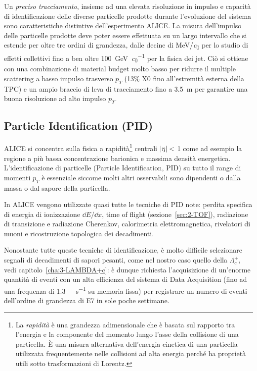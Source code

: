         Un \textit{preciso tracciamento}, insieme ad una elevata risoluzione in impulso e capacità di identificazione delle diverse particelle prodotte durante l’evoluzione del sistema sono caratteristiche distintive dell’esperimento ALICE. La misura dell’impulso delle particelle prodotte deve poter essere effettuata su un largo intervallo che si estende per oltre tre ordini di grandezza, dalle decine di \unit[per-mode = symbol]{\mega \eV \per \clight} per lo studio di effetti collettivi fino a ben oltre \qty[per-mode = symbol]{100}{\giga \eV \per \clight} per la fisica dei jet. Ciò si ottiene con una combinazione di material budget molto basso per ridurre il multiple scattering a basso impulso trasverso $p_{T}$ (13\% X0 fino all’estremità esterna della TPC) e un ampio braccio di leva di tracciamento fino a \qty{3.5}{\meter} per garantire una buona risoluzione ad alto impulso $p_{T}$.

    \subsection{Particle Identification (PID)}
        ALICE si concentra sulla fisica a rapidità\footnote{La \textit{rapidità} è una grandezza adimensionale che è basata sul rapporto tra l’energia e la componente del momento lungo l’asse della collisione di una particella. È una misura alternativa dell’energia cinetica di una particella utilizzata frequentemente nelle collisioni ad alta energia perché ha proprietà utili sotto trasformazioni di Lorentz.} centrali $\abs{\eta} <$ \num{1} come ad esempio la regione a più bassa concentrazione barionica e massima densità energetica. L’identificazione di particelle (Particle Identification, PID) su tutto il range di momenti $p_{T}$ è essenziale siccome molti altri osservabili sono dipendenti o dalla massa o dal sapore della particella.

        In ALICE vengono utilizzate quasi tutte le tecniche di PID note: perdita specifica di energia di ionizzazione $\dd{E}/\dd{x}$, time of flight (sezione~\ref{sec:2-TOF}), radiazione di transizione e radiazione Cherenkov, calorimetria elettromagnetica, rivelatori di muoni e ricostruzione topologica dei decadimenti.

        Nonostante tutte queste tecniche di identificazione, è molto difficile selezionare segnali di decadimenti di sapori pesanti, come nel nostro caso quello della $\Lambda_{c}^{+}$, vedi capitolo~\ref{cha:3-LAMBDA+c}: è dunque richiesta l’acquisizione di un’enorme quantità di eventi con un alta efficienza del sistema di Data Acquisition (fino ad una frequenza di \qty[per-mode = symbol]{1.3}{\giga \byte \per \second} su memoria fissa) per registrare un numero di eventi dell’ordine di grandezza di \num{E7} in sole poche settimane.
        

